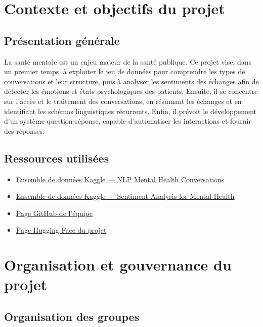 \documentclass[12pt,a4paper]{report}
\begin{document}
\chapter{Contexte et objectifs du projet}

\section{Présentation générale}

La santé mentale est un enjeu majeur de la santé publique. Ce projet vise, dans un premier temps, à exploiter le jeu de données pour comprendre les types de conversations et leur structure, puis à analyser les sentiments des échanges afin de détecter les émotions et états psychologiques des patients. Ensuite, il se concentre sur l'accès et le traitement des conversations, en résumant les échanges et en identifiant les schémas linguistiques récurrents. Enfin, il prévoit le développement d'un système question-réponse, capable d'automatiser les interactions et fournir des réponses.

\section{Ressources utilisées}

\begin{itemize}
\item \href{https://www.kaggle.com/datasets/thedevastator/nlp-mental-health-conversations}{Ensemble de données Kaggle — NLP Mental Health Conversations}
\item \href{https://www.kaggle.com/datasets/suchintikasarkar/sentiment-analysis-for-mental-health/data}{Ensemble de données Kaggle — Sentiment Analysis for Mental Health}
\item \href{https://github.com/cypnet/Analyse-de-conversations-sur-la-sant-mentale-}{Page GitHub de l'équipe}
\item \href{https://huggingface.co/spaces/dempxl/sentiment-analysis-for-mental-health}{Page Hugging Face du projet}
\end{itemize}

\chapter{Organisation et gouvernance du projet}

\section{Organisation des groupes}
\end{document}
